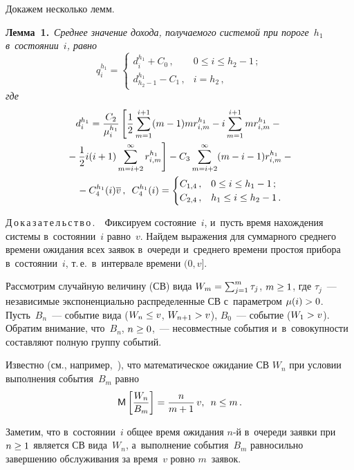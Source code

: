 \begin{multicols}{2}
  Докажем несколько лемм. 
  
  \smallskip
  
  \noindent
  \textbf{Лемма~1.}\ \textit{Среднее значение дохода, получаемого сис\-те\-мой 
при пороге~$h_1$ в~состоянии~$i$, равно}
  \begin{equation}
  q_i^{h_1}=\begin{cases}
  d_i^{h_1}+C_0\,, & 0\leq i\leq h_2-1\,;\\
  d^{h_1}_{h_2-1} -C_1\,, & i=h_2\,,
  \end{cases}
  \label{e5-aga}
  \end{equation}
  \textit{где}
  \begin{multline*}
  d_i^{h_1} =\displaystyle\frac{\displaystyle C_2\mathstrut}{\displaystyle \mu_i^{h_1}\mathstrut} \left[ \displaystyle\frac{\displaystyle 1\mathstrut}{\displaystyle 2\mathstrut}\sum\limits_{m=1}^{i+1} (m-1) 
mr^{h_1}_{i,m} -i\sum\limits_{m=1}^{i+1} mr^{h_1}_{i,m} -{}\right.\\
\left.{}-\displaystyle\frac{\displaystyle 1\mathstrut}{\displaystyle 2\mathstrut} i(i+1) 
\sum\limits^\infty_{m=i+2} r^{h_1}_{i,m}\right] - C_3 \sum\limits^\infty_{m=i+2} 
(m-i-1) r^{h_1}_{i,m} -{}\\
{}-C_4^{h_1}(i)\overline{v}\,,
\enskip
   C_4^{h_1}(i)= \begin{cases}
   C_{1,4}\,, & 0\leq i\leq h_1-1\,;\\
   C_{2,4}\,, & h_1\leq i\leq h_2-1\,.
   \end{cases}
  \end{multline*}
  
  \noindent
  Д\,о\,к\,а\,з\,а\,т\,е\,л\,ь\,с\,т\,в\,о\,.\ \ Фиксируем со\-сто\-яние~$i$, 
и~пусть время нахождения сис\-те\-мы в~со\-сто\-янии~$i$ рав\-но~$v$. Найдем 
выражения для суммарного сред\-не\-го времени ожидания всех заявок в~очереди 
и~среднего времени простоя прибора в~со\-сто\-янии~$i$, т.\,е.\ в~интервале 
времени $(0,v]$. 
  
  Рассмотрим случайную величину (СВ) вида $W_m\hm= \sum\nolimits^m_{j=1} \tau_j$, $m\hm\geq 
1$, где $\tau_j$~--- независимые экспоненциально распределенные СВ
с~па\-ра\-мет\-ром $\mu(i)\hm>0$. Пусть~$B_n$~--- событие вида ($W_n\hm\leq v$, 
$W_{n+1}\hm>v$), $B_0$~--- событие ($W_1\hm>v$). Обратим внимание, 
что~$B_n$, $n\hm\geq 0$,~--- несовместные события и~в~совокупности 
со\-став\-ля\-ют пол\-ную группу событий. 
  
  Известно (см., например,~\cite{5-aga}), что математическое ожидание СВ
$W_n$ при условии выполнения события~$B_m$ равно 
  $$
  {\sf M}\left[\displaystyle\frac{\displaystyle W_n\mathstrut}{\displaystyle B_m\mathstrut}\right]= \displaystyle\frac{\displaystyle n\mathstrut}{\displaystyle m+1\mathstrut}\,v,\enskip n\leq m\,.
  $$
  
  Заметим, что в~состоянии~$i$ общее время ожидания $n$-й в~очереди заявки 
при $n\hm\geq 1$ является СВ вида~$W_n$, а~выполнение 
события~$B_m$ равносильно завершению обслуживания за время~$v$ ров\-но 
$m$~заявок. 
  

\end{multicols}
